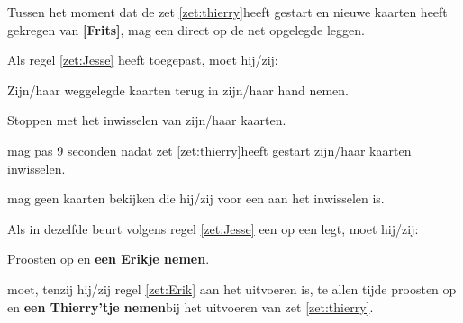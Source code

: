 
\vervolgLijst{}
    \item \label{zet:Jesse} Tussen het moment dat de \huidigeSpeler zet \ref{zet:thierry}\footnotemark[1] heeft gestart en nieuwe kaarten heeft gekregen van \textbf{[Frits]}, mag \eenSpeler een \footnotemark[3] direct op de net opgelegde \footnotemark[4] leggen.
 \eindLijst{}
  
\vervolgLijst{}   
    \item \label{zet:Jesse_2} Als \eenSpeler regel \ref{zet:Jesse} heeft toegepast, moet hij/zij:
    \puntLijst{}
        \item Zijn/haar weggelegde kaarten terug in zijn/haar hand nemen.
        \item Stoppen met het inwisselen van zijn/haar kaarten. 
    \eindPuntLijst{}
\eindLijst{}

\vervolgLijst{}
    \item \Frits mag pas 9 seconden nadat \eenSpeler zet \ref{zet:thierry}\footnotemark[1] heeft gestart zijn/haar kaarten inwisselen. 
\eindLijst{}

\vervolgLijst{}
    \item \Frits mag geen kaarten bekijken die hij/zij voor een \andereSpeler aan het inwisselen is.
\eindLijst{}

\vervolgLijst{}
    \item \label{zet:Erik} Als \eenSpeler in dezelfde beurt volgens regel \ref{zet:Jesse} een \footnotemark[3] op een \footnotemark[4] legt, moet hij/zij:
    \puntLijst{}
        \item Proosten op  en \textbf{een Erikje nemen}\footnotemark[6].
    \eindPuntLijst{}
\eindLijst{}

\vervolgLijst{}
    \item \label{zet:Erik_2} \EenSpeler moet, tenzij hij/zij regel \ref{zet:Erik} aan het uitvoeren is, te allen tijde proosten op  en \textbf{een Thierry'tje nemen}\footnotemark[6] bij het uitvoeren van zet \ref{zet:thierry}\footnotemark[1].
\eindLijst{}

